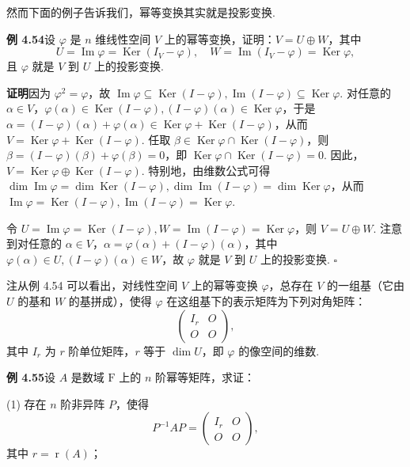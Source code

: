 \documentclass[UTF8,12pt,a4paper,fontset=fandol]{ctexart}
\begin{document}
然而下面的例子告诉我们，幂等变换其实就是投影变换.

\noindent\textbf{例 4.54}\quad 设 $\varphi$ 是 $n$ 维线性空间 $V$ 上的幂等变换，证明：$V=U\oplus W$，其中
\[
U=\operatorname{Im}\varphi=\operatorname{Ker}(I_V-\varphi),\quad
W=\operatorname{Im}(I_V-\varphi)=\operatorname{Ker}\varphi,
\]
且 $\varphi$ 就是 $V$ 到 $U$ 上的投影变换.

\noindent\textbf{证明}\quad 因为 $\varphi^2=\varphi$，故 $\operatorname{Im}\varphi\subseteq\operatorname{Ker}(I-\varphi),\operatorname{Im}(I-\varphi)\subseteq\operatorname{Ker}\varphi$. 对任意的 $\alpha\in V$，$\varphi(\alpha)\in\operatorname{Ker}(I-\varphi),(I-\varphi)(\alpha)\in\operatorname{Ker}\varphi$，于是 $\alpha=(I-\varphi)(\alpha)+\varphi(\alpha)\in\operatorname{Ker}\varphi+\operatorname{Ker}(I-\varphi)$，从而 $V=\operatorname{Ker}\varphi+\operatorname{Ker}(I-\varphi)$. 任取 $\beta\in\operatorname{Ker}\varphi\cap\operatorname{Ker}(I-\varphi)$，则 $\beta=(I-\varphi)(\beta)+\varphi(\beta)=0$，即 $\operatorname{Ker}\varphi\cap\operatorname{Ker}(I-\varphi)=0$. 因此，$V=\operatorname{Ker}\varphi\oplus\operatorname{Ker}(I-\varphi)$. 特别地，由维数公式可得 $\dim\operatorname{Im}\varphi=\dim\operatorname{Ker}(I-\varphi),\dim\operatorname{Im}(I-\varphi)=\dim\operatorname{Ker}\varphi$，从而 $\operatorname{Im}\varphi=\operatorname{Ker}(I-\varphi),\operatorname{Im}(I-\varphi)=\operatorname{Ker}\varphi$.

令 $U=\operatorname{Im}\varphi=\operatorname{Ker}(I-\varphi),W=\operatorname{Im}(I-\varphi)=\operatorname{Ker}\varphi$，则 $V=U\oplus W$. 注意到对任意的 $\alpha\in V$，$\alpha=\varphi(\alpha)+(I-\varphi)(\alpha)$，其中 $\varphi(\alpha)\in U,(I-\varphi)(\alpha)\in W$，故 $\varphi$ 就是 $V$ 到 $U$ 上的投影变换. $\square$

注\quad 从例 4.54 可以看出，对线性空间 $V$ 上的幂等变换 $\varphi$，总存在 $V$ 的一组基（它由 $U$ 的基和 $W$ 的基拼成），使得 $\varphi$ 在这组基下的表示矩阵为下列对角矩阵：
\[
\left(\begin{array}{cc}
I_r & O\\
O & O
\end{array}\right),
\]
其中 $I_r$ 为 $r$ 阶单位矩阵，$r$ 等于 $\dim U$，即 $\varphi$ 的像空间的维数.

\noindent\textbf{例 4.55}\quad 设 $A$ 是数域 $\mathrm{F}$ 上的 $n$ 阶幂等矩阵，求证：

(1) 存在 $n$ 阶非异阵 $P$，使得
\[
P^{-1}AP=\left(\begin{array}{cc}
I_r & O\\
O & O
\end{array}\right),
\]
其中 $r=\operatorname{r}(A)$；
\end{document}
